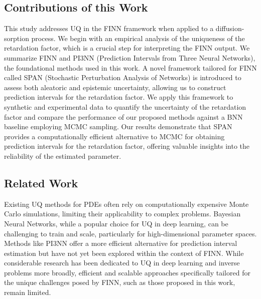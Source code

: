 \subsection{Contributions of this Work}
This study addresses UQ in the FINN framework when applied to a diffusion-sorption process. We begin with an empirical analysis of the uniqueness of the retardation factor, which is a crucial step for interpreting the FINN output. We summarize FINN and PI3NN (Prediction Intervals from Three Neural Networks), the foundational methods used in this work.
A novel framework tailored for FINN called SPAN (Stochastic Perturbation Analysis of Networks) is introduced to assess both aleatoric and epistemic uncertainty, allowing us to construct prediction intervals for the retardation factor.
We apply this framework to synthetic and experimental data to quantify the uncertainty of the retardation factor and compare the performance of our proposed methods against a BNN baseline employing MCMC sampling. Our results demonstrate that SPAN provides a computationally efficient alternative to MCMC for obtaining prediction intervals for the retardation factor, offering valuable insights into the reliability of the estimated parameter.


\subsection{Related Work}
Existing UQ methods for PDEs often rely on computationally expensive Monte Carlo simulations, limiting their applicability to complex problems. Bayesian Neural Networks, while a popular choice for UQ in deep learning, can be challenging to train and scale, particularly for high-dimensional parameter spaces. Methods like PI3NN offer a more efficient alternative for prediction interval estimation but have not yet been explored within the context of FINN. While considerable research has been dedicated to UQ in deep learning and inverse problems more broadly, efficient and scalable approaches specifically tailored for the unique challenges posed by FINN, such as those proposed in this work, remain limited. %


